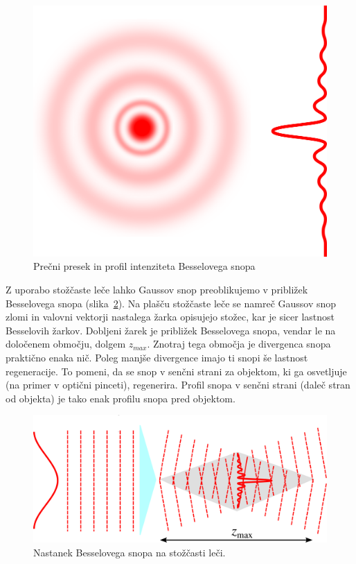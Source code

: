 \begin{figure}[h]
\centering
\includegraphics[width=6truecm]{slike/03_Bessel_Intensity.png}
\caption{Prečni presek in profil intenziteta Besselovega snopa}
\label{fig:Besselov_presek}
\end{figure}

\begin{remark}
Z uporabo stožčaste leče lahko Gaussov snop
preoblikujemo v približek Besselovega snopa (slika~\ref{fig:Bessel_leca}). 
Na plašču stožčaste leče se namreč Gaussov snop zlomi in valovni vektorji 
nastalega žarka opisujejo stožec, kar je sicer lastnost Besselovih žarkov.
Dobljeni žarek je približek Besselovega snopa, vendar le na določenem območju, dolgem $z_{max}$.
Znotraj tega območja je divergenca snopa praktično enaka nič. Poleg manjše divergence
imajo ti snopi še lastnost regeneracije. To pomeni, da se snop v senčni strani
za objektom, ki ga osvetljuje (na primer v optični pinceti), regenerira. 
Profil snopa v senčni strani (daleč stran od objekta) je tako enak profilu 
snopa pred objektom. 
\begin{figure}[h]
\centering
\includegraphics[width=8truecm]{slike/03_Bessel_leca.png}
\caption{Nastanek Besselovega snopa na stožčasti leči.}
\label{fig:Bessel_leca}
\end{figure}
\end{remark}

